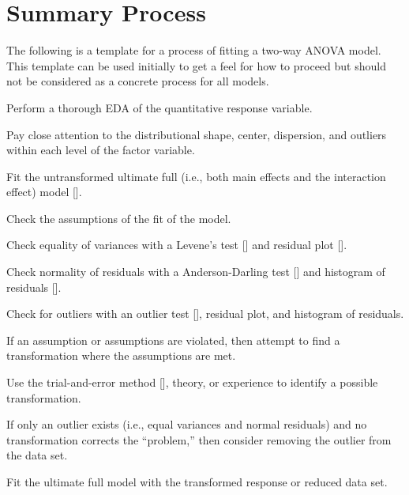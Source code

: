 \documentclass[10pt,openany]{book}\usepackage[]{graphicx}\usepackage[]{color}
\begin{document}
\section{Summary Process}
The following is a template for a process of fitting a two-way ANOVA model.  This template can be used initially to get a feel for how to proceed but should not be considered as a concrete process for all models.

\vspace{-10pt}
\begin{Enumerate}
  \item Perform a thorough EDA of the quantitative response variable.
    \begin{Itemize}
      \item Pay close attention to the distributional shape, center, dispersion, and outliers within each level of the factor variable.
    \end{Itemize}
  \item Fit the untransformed ultimate full (i.e., both main effects and the interaction effect) model [].
  \item Check the assumptions of the fit of the model.
    \begin{Itemize}
      \item Check equality of variances with a Levene's test [] and residual plot [].
      \item Check normality of residuals with a Anderson-Darling test [] and histogram of residuals [].
      \item Check for outliers with an outlier test [], residual plot, and histogram of residuals.
    \end{Itemize}
  \item If an assumption or assumptions are violated, then attempt to find a transformation where the assumptions are met.
    \begin{Itemize}
      \item Use the trial-and-error method [], theory, or experience to identify a possible transformation.
      \item If only an outlier exists (i.e., equal variances and normal residuals) and no transformation corrects the ``problem,'' then consider removing the outlier from the data set.
      \item Fit the ultimate full model with the transformed response or reduced data set.
    \end{Itemize}

\end{Enumerate}
\end{document}
